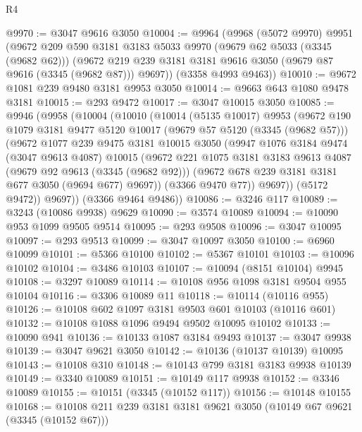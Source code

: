 \begin{lexlean}{R4}
\begin{coremodule}
@9970 := @3047 @9616 @3050
@10004 := @9964
    (@9968
      (@5072 @9970)
      @9951
      (@9672
        @209
        @590
        @3181
        @3183
        @5033
        @9970
        (@9679 @62 @5033 (@3345 (@9682 @62)))
        (@9672 @219 @239 @3181 @3181 @9616 @3050 (@9679 @87 @9616 (@3345 (@9682 @87))) @9697))
      (@3358 @4993 @9463))
@10010 := @9672 @1081 @239 @9480 @3181 @9953 @3050
@10014 := @9663 @643 @1080 @9478 @3181
@10015 := @293 @9472
@10017 := @3047 @10015 @3050
@10085 := @9946
    (@9958
      (@10004
        (@10010
          (@10014
            (@5135 @10017)
            @9953
            (@9672
              @190
              @1079
              @3181
              @9477
              @5120
              @10017
              (@9679 @57 @5120 (@3345 (@9682 @57)))
              (@9672
                @1077
                @239
                @9475
                @3181
                @10015
                @3050
                (@9947
                  @1076
                  @3184
                  @9474
                  (@3047 @9613 @4087)
                  @10015
                  (@9672
                    @221
                    @1075
                    @3181
                    @3183
                    @9613
                    @4087
                    (@9679 @92 @9613 (@3345 (@9682 @92)))
                    (@9672 @678 @239 @3181 @3181 @677 @3050 (@9694 @677) @9697))
                  (@3366 @9470 @77))
                @9697))
            (@5172 @9472))
          @9697))
      (@3366 @9464 @9486))
@10086 := @3246 @117
@10089 := @3243 (@10086 @9938) @9629
@10090 := @3574 @10089
@10094 := @10090 @953 @1099 @9505 @9514
@10095 := @293 @9508
@10096 := @3047 @10095
@10097 := @293 @9513
@10099 := @3047 @10097 @3050
@10100 := @6960 @10099
@10101 := @5366 @10100
@10102 := @5367 @10101
@10103 := @10096 @10102
@10104 := @3486 @10103
@10107 := @10094 (@8151 @10104) @9945
@10108 := @3297 @10089
@10114 := @10108 @956 @1098 @3181 @9504 @955 @10104
@10116 := @3306 @10089 @11
@10118 := @10114 (@10116 @955)
@10126 := @10108 @602 @1097 @3181 @9503 @601 @10103 (@10116 @601)
@10132 := @10108 @1088 @1096 @9494 @9502 @10095 @10102
@10133 := @10090 @941
@10136 := @10133 @1087 @3184 @9493
@10137 := @3047 @9938
@10139 := @3047 @9621 @3050
@10142 := @10136 (@10137 @10139) @10095
@10143 := @10108 @310
@10148 := @10143 @799 @3181 @3183 @9938 @10139
@10149 := @3340 @10089
@10151 := @10149 @117 @9938
@10152 := @3346 @10089
@10155 := @10151 (@3345 (@10152 @117))
@10156 := @10148 @10155
@10168 := @10108 @211 @239 @3181 @3181 @9621 @3050 (@10149 @67 @9621 (@3345 (@10152 @67)))

\end{coremodule}
\end{lexlean}
